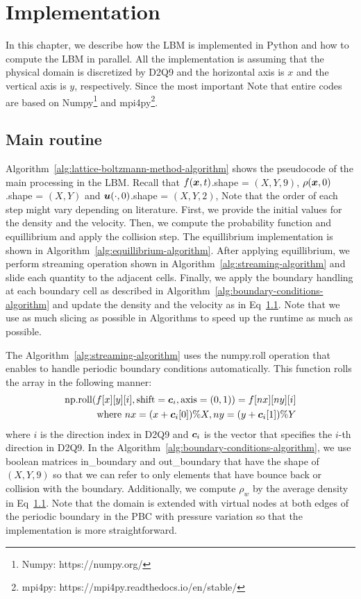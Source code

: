 \chapter{Implementation}
\vspace{-5mm}
In this chapter, we describe how the LBM is implemented in Python
and how to compute the LBM in parallel.
All the implementation is assuming that
the physical domain is discretized by D2Q9
and the horizontal axis is $x$ and 
the vertical axis is $y$, respectively.
Since the most important
Note that entire codes are based on
Numpy\footnote{Numpy: https://numpy.org/}
and mpi4py\footnote{mpi4py: https://mpi4py.readthedocs.io/en/stable/}.

\section{Main routine}
Algorithm~\ref{alg:lattice-boltzmann-method-algorithm}
shows the pseudocode of the main processing in the LBM.
Recall that $f(\boldsymbol{x}, t)$.shape = $(X, Y, 9)$,
$\rho(\boldsymbol{x}, 0)$.shape = $(X, Y)$ and $\boldsymbol{u}(\cdot, 0)$.shape = $(X, Y, 2)$, 
Note that the order of each step might vary depending on literature\cite{}.
First, we provide the initial values for the density and the velocity.
Then, we compute the probability function and equillibrium and
apply the collision step.
The equillibrium implementation is shown in Algorithm~\ref{alg:equillibrium-algorithm}.
After applying equillibrium, we perform
streaming operation shown in Algorithm~\ref{alg:streaming-algorithm}
and slide each quantity to the adjacent cells.
Finally, we apply the boundary handling at each boundary cell as 
described in Algorithm~\ref{alg:boundary-conditions-algorithm}
and update the density and the velocity as in Eq~\ref{}.
Note that we use as much slicing as possible in 
Algorithms to speed up the runtime as much as possible.

The Algorithm~\ref{alg:streaming-algorithm} uses
the numpy.roll operation that enables
to handle periodic boundary conditions automatically.
This function rolls the array in the following manner:
\begin{equation}
\begin{aligned}
  \text{np.roll}(f[x][y][i], \text{shift}=\boldsymbol{c}_i, \text{axis}=(0, 1)) =
  f[nx][ny][i] \\
  \text{where }
  nx = (x + \boldsymbol{c}_i[0]) \% X,
  ny = (y + \boldsymbol{c}_i[1]) \% Y
\end{aligned}
\end{equation}
where $i$ is the direction index in D2Q9 and $\boldsymbol{c}_i$ is the vector
that specifies the $i$-th direction in D2Q9.
In the Algorithm~\ref{alg:boundary-conditions-algorithm},
we use boolean matrices in\_boundary and out\_boundary
that have the shape of $(X, Y, 9)$ so that 
we can refer to only elements that have bounce back or collision
with the boundary.
Additionally, we compute $\rho_w$ by the average density in Eq~\ref{}.
Note that the domain is extended with virtual nodes 
at both edges of the periodic boundary in the PBC with pressure variation
so that the implementation is more straightforward. 


